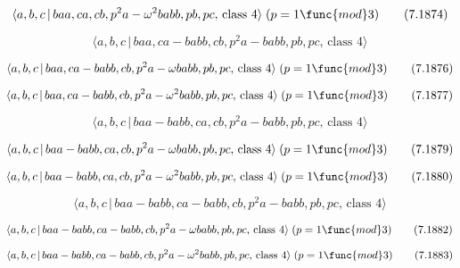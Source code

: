 \documentclass[10pt]{article}
\begin{document}
\begin{equation}
\langle a,b,c\,|\,baa,ca,cb,p^{2}a-\omega ^{2}babb,pb,pc,\,\text{class }%
4\rangle \;(p=1\func{mod}3)  \tag{7.1874}
\end{equation}

\begin{equation}
\langle a,b,c\,|\,baa,ca-babb,cb,p^2a-babb,pb,pc,\,\text{class }4\rangle 
\tag{7.1875}
\end{equation}

\begin{equation}
\langle a,b,c\,|\,baa,ca-babb,cb,p^{2}a-\omega babb,pb,pc,\,\text{class }%
4\rangle \;(p=1\func{mod}3)  \tag{7.1876}
\end{equation}

\begin{equation}
\langle a,b,c\,|\,baa,ca-babb,cb,p^{2}a-\omega ^{2}babb,pb,pc,\,\text{class }%
4\rangle \;(p=1\func{mod}3)  \tag{7.1877}
\end{equation}

\begin{equation}
\langle a,b,c\,|\,baa-babb,ca,cb,p^2a-babb,pb,pc,\,\text{class }4\rangle 
\tag{7.1878}
\end{equation}

\begin{equation}
\langle a,b,c\,|\,baa-babb,ca,cb,p^{2}a-\omega babb,pb,pc,\,\text{class }%
4\rangle \;(p=1\func{mod}3)  \tag{7.1879}
\end{equation}

\begin{equation}
\langle a,b,c\,|\,baa-babb,ca,cb,p^{2}a-\omega ^{2}babb,pb,pc,\,\text{class }%
4\rangle \;(p=1\func{mod}3)  \tag{7.1880}
\end{equation}

\begin{equation}
\langle a,b,c\,|\,baa-babb,ca-babb,cb,p^2a-babb,pb,pc,\,\text{class }4\rangle
\tag{7.1881}
\end{equation}

\begin{equation}
\langle a,b,c\,|\,baa-babb,ca-babb,cb,p^{2}a-\omega babb,pb,pc,\,\text{class 
}4\rangle \;(p=1\func{mod}3)  \tag{7.1882}
\end{equation}

\begin{equation}
\langle a,b,c\,|\,baa-babb,ca-babb,cb,p^{2}a-\omega ^{2}babb,pb,pc,\,\text{%
class }4\rangle \;(p=1\func{mod}3)  \tag{7.1883}
\end{equation}
\end{document}
